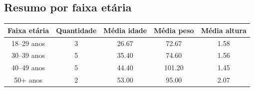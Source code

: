 \documentclass[11pt]{article}
\begin{document}
\subsection*{Resumo por faixa etária}

\begin{center}
\small
\begin{tabular}{|c|c|c|c|c|}
\hline
Faixa etária & Quantidade & Média idade & Média peso & Média altura \\ \hline
18--29 anos & 3 & 26.67 & 72.67 & 1.58 \\ \hline
30--39 anos & 5 & 35.40 & 74.60 & 1.56 \\ \hline
40--49 anos & 5 & 44.40 & 101.20 & 1.45 \\ \hline
50+ anos    & 2 & 53.00 & 95.00 & 2.07 \\ \hline
\end{tabular}
\end{center}
\end{document}
